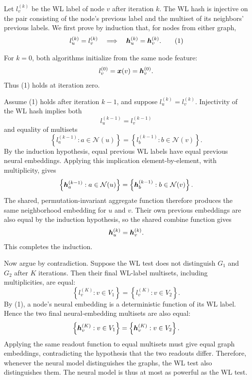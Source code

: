 \begin{solution}
Let \(l_v^{(k)}\) be the WL label of node \(v\) after iteration \(k\).  The
WL hash is injective on the pair consisting of the node's previous label and
the multiset of its neighbors' previous labels.  We first prove by induction
that, for nodes from either graph,
\[
  l_u^{(k)}=l_v^{(k)}
  \quad\Longrightarrow\quad
  \bm{h}_u^{(k)}=\bm{h}_v^{(k)}.
  \tag{1}
\]

For \(k=0\), both algorithms initialize from the same node feature:
\[
  l_v^{(0)}=\bm{x}(v)=\bm{h}_v^{(0)}.
\]
Thus (1) holds at iteration zero.

Assume (1) holds after iteration \(k-1\), and suppose
\(l_u^{(k)}=l_v^{(k)}\).  Injectivity of the WL hash implies both
\[
  l_u^{(k-1)}=l_v^{(k-1)}
\]
and equality of multisets
\[
  \left\{l_a^{(k-1)}:a\in\mathcal N(u)\right\}
  =
  \left\{l_b^{(k-1)}:b\in\mathcal N(v)\right\}.
\]
By the induction hypothesis, equal previous WL labels have equal previous
neural embeddings.  Applying this implication element-by-element, with
multiplicity, gives
\[
  \left\{\bm{h}_a^{(k-1)}:a\in\mathcal N(u)\right\}
  =
  \left\{\bm{h}_b^{(k-1)}:b\in\mathcal N(v)\right\}.
\]
The shared, permutation-invariant aggregate function therefore produces the
same neighborhood embedding for \(u\) and \(v\).  Their own previous
embeddings are also equal by the induction hypothesis, so the shared combine
function gives
\[
  \bm{h}_u^{(k)}=\bm{h}_v^{(k)}.
\]
This completes the induction.

Now argue by contradiction.  Suppose the WL test does not distinguish
\(G_1\) and \(G_2\) after \(K\) iterations.  Then their final WL-label
multisets, including multiplicities, are equal:
\[
  \left\{l_v^{(K)}:v\in V_1\right\}
  =
  \left\{l_v^{(K)}:v\in V_2\right\}.
\]
By (1), a node's neural embedding is a deterministic function of its WL
label.  Hence the two final neural-embedding multisets are also equal:
\[
  \left\{\bm{h}_v^{(K)}:v\in V_1\right\}
  =
  \left\{\bm{h}_v^{(K)}:v\in V_2\right\}.
\]
Applying the same readout function to equal multisets must give equal graph
embeddings, contradicting the hypothesis that the two readouts differ.
Therefore, whenever the neural model distinguishes the graphs, the WL test
also distinguishes them.  The neural model is thus at most as powerful as
the WL test.
\end{solution}
